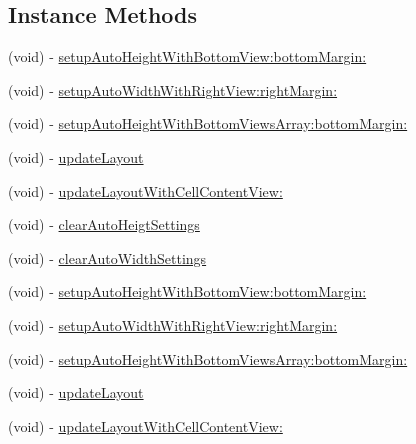 \subsection*{Instance Methods}
\begin{DoxyCompactItemize}
\item 
(void) -\/ \mbox{\hyperlink{category_u_i_view_07_s_d_auto_height_width_08_a6aaa13ab882308efc956c61ce8048d42}{setup\+Auto\+Height\+With\+Bottom\+View\+:bottom\+Margin\+:}}
\item 
(void) -\/ \mbox{\hyperlink{category_u_i_view_07_s_d_auto_height_width_08_a6a5aef3556763e741213220f213ab2dd}{setup\+Auto\+Width\+With\+Right\+View\+:right\+Margin\+:}}
\item 
(void) -\/ \mbox{\hyperlink{category_u_i_view_07_s_d_auto_height_width_08_a48d60ee68bbf7207dc0fbe1b42e4293d}{setup\+Auto\+Height\+With\+Bottom\+Views\+Array\+:bottom\+Margin\+:}}
\item 
(void) -\/ \mbox{\hyperlink{category_u_i_view_07_s_d_auto_height_width_08_a8d81f0e5093a8917c4004c7e1e46ea11}{update\+Layout}}
\item 
(void) -\/ \mbox{\hyperlink{category_u_i_view_07_s_d_auto_height_width_08_ad0e71cc33b6b6cb7ad65236d0a8e5df9}{update\+Layout\+With\+Cell\+Content\+View\+:}}
\item 
(void) -\/ \mbox{\hyperlink{category_u_i_view_07_s_d_auto_height_width_08_a38d78c51a7fe6eddf23ce486eb838baa}{clear\+Auto\+Heigt\+Settings}}
\item 
(void) -\/ \mbox{\hyperlink{category_u_i_view_07_s_d_auto_height_width_08_ab7b5ebfebbcf5fbc42a3ca4aaa9a4ec3}{clear\+Auto\+Width\+Settings}}
\item 
(void) -\/ \mbox{\hyperlink{category_u_i_view_07_s_d_auto_height_width_08_a6aaa13ab882308efc956c61ce8048d42}{setup\+Auto\+Height\+With\+Bottom\+View\+:bottom\+Margin\+:}}
\item 
(void) -\/ \mbox{\hyperlink{category_u_i_view_07_s_d_auto_height_width_08_a6a5aef3556763e741213220f213ab2dd}{setup\+Auto\+Width\+With\+Right\+View\+:right\+Margin\+:}}
\item 
(void) -\/ \mbox{\hyperlink{category_u_i_view_07_s_d_auto_height_width_08_a48d60ee68bbf7207dc0fbe1b42e4293d}{setup\+Auto\+Height\+With\+Bottom\+Views\+Array\+:bottom\+Margin\+:}}
\item 
(void) -\/ \mbox{\hyperlink{category_u_i_view_07_s_d_auto_height_width_08_a8d81f0e5093a8917c4004c7e1e46ea11}{update\+Layout}}
\item 
(void) -\/ \mbox{\hyperlink{category_u_i_view_07_s_d_auto_height_width_08_ad0e71cc33b6b6cb7ad65236d0a8e5df9}{update\+Layout\+With\+Cell\+Content\+View\+:}}

\end{DoxyCompactItemize}
